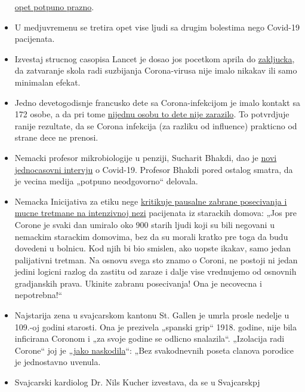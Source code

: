 \begin{itemize}
  \href{https://orf.at/stories/3162642/}{opet potpuno prazno}.
\item
  U medjuvremenu se tretira opet vise ljudi sa drugim bolestima nego
  Covid-19 pacijenata.
\item
  Izvestaj strucnog casopisa Lancet je dosao jos pocetkom aprila do
  \href{https://www.thelancet.com/journals/lanchi/article/PIIS2352-4642(20)30095-X/fulltext}{zakljucka},
  da zatvaranje skola radi suzbijanja Corona-virusa nije imalo nikakav
  ili samo minimalan efekat.
\item
  Jedno devetogodisnje francusko dete sa Corona-infekcijom je imalo
  kontakt sa 172 osobe, a da pri tome
  \href{https://www.n-tv.de/panorama/172-Kontaktpersonen-von-Corona-verschont-article21727469.html}{nijednu
  osobu to dete nije zarazilo}. To potvrdjuje ranije rezultate, da se
  Corona infekcija (za razliku od influence) prakticno od strane dece ne
  prenosi.
\item
  Nemacki profesor mikrobiologije u penziji, Sucharit Bhakdi, dao je
  \href{https://kenfm.de/kenfm-am-set-gespraech-mit-prof-dr-sucharit-bhakdi-zu-covid-19/}{novi
  jednocasovni intervju} o Covid-19. Profesor Bhakdi pored ostalog
  smatra, da je vecina medija „potpuno neodgovorno`` delovala.
\item
  Nemacka Inicijativa za etiku nege
  \href{http://pflegeethik-initiative.de/2020/04/15/corona-krise-falsche-prioritaeten-gesetzt-und-ethische-prinzipien-verletzt/}{kritikuje
  pausalne zabrane posecivanja i mucne tretmane na intenzivnoj nezi}
  pacijenata iz starackih domova: „Jos pre Corone je svaki dan umiralo
  oko 900 starih ljudi koji su bili negovani u nemackim starackim
  domovima, bez da su morali kratko pre toga da budu dovedeni u bolnicu.
  Kod njih bi bio smislen, ako uopste ikakav, samo jedan palijativni
  tretman. Na osnovu svega sto znamo o Coroni, ne postoji ni jedan
  jedini logicni razlog da zastitu od zaraze i dalje vise vrednujemo od
  osnovnih gradjanskih prava. Ukinite zabranu posecivanja! Ona je
  necovecna i nepotrebna!``
\item
  Najstarija zena u svajcarskom kantonu St. Gallen je umrla prosle
  nedelje u 109.-oj godini starosti. Ona je prezivela „spanski grip``
  1918. godine, nije bila inficirana Coronom i „za svoje godine se
  odlicno snalazila``. „Izolacija radi Corone`` joj je
  „\href{https://swprs.files.wordpress.com/2020/04/tagblatt-109.jpg}{jako
  naskodila}``: „Bez svakodnevnih poseta clanova porodice je jednostavno
  uvenula.
\item
  Svajcarski kardiolog Dr. Nils Kucher izvestava, da se u Svajcarskpj

\end{itemize}
